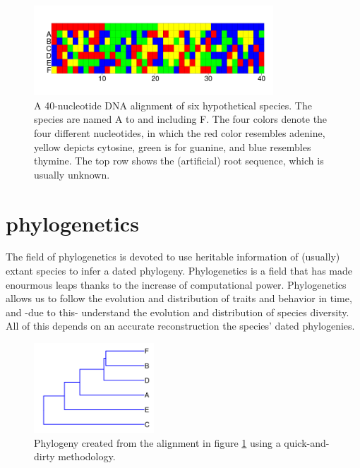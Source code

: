 \begin{figure}[H]
  \includegraphics[width=0.8\textwidth]{alignment_40_with_root.png}
  \caption{
    A 40-nucleotide DNA alignment of six hypothetical species. The species
    are named A to and including F. 
    The four colors denote the four different nucleotides,
    in which the red color resembles adenine, yellow depicts cytosine, 
    green is for guanine, and blue resembles thymine. The top
    row shows the (artificial) root sequence, which is usually unknown.
  }
  \label{fig:alignment}
\end{figure}

\section{phylogenetics}

The field of phylogenetics is devoted to
use heritable information of (usually) extant species to
infer a dated phylogeny. Phylogenetics is a field that has
made enourmous leaps thanks to the increase of computational power.
Phylogenetics allows us to follow the evolution and distribution
of traits and behavior in time, and -due to this-
understand the evolution and distribution of species diversity.
All of this depends on an accurate reconstruction the species' dated phylogenies.

\begin{figure}[H]
  \includegraphics[width=0.4\textwidth]{phylogeny_40_upgma.png}
  \caption{
    Phylogeny created from the alignment in figure \ref{fig:alignment} 
    using a quick-and-dirty methodology.
  }
  \label{fig:phylogeny_upgma}
\end{figure}

